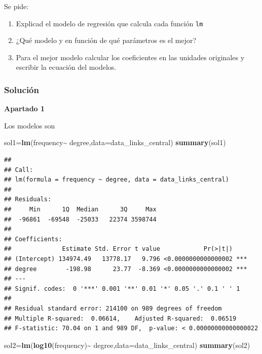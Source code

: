 \documentclass[
]{article}
\newenvironment{Shaded}{\begin{snugshade}}{\end{snugshade}}
\newcommand{\DataTypeTok}[1]{\textcolor[rgb]{0.13,0.29,0.53}{#1}}
\newcommand{\KeywordTok}[1]{\textcolor[rgb]{0.13,0.29,0.53}{\textbf{#1}}}
\newcommand{\NormalTok}[1]{#1}
\newcommand{\OperatorTok}[1]{\textcolor[rgb]{0.81,0.36,0.00}{\textbf{#1}}}
\newcommand{\StringTok}[1]{\textcolor[rgb]{0.31,0.60,0.02}{#1}}
\providecommand{\tightlist}{%
  \setlength{\itemsep}{0pt}\setlength{\parskip}{0pt}}
\begin{document}
Se pide:

\begin{enumerate}
\def\labelenumi{\arabic{enumi}.}
\tightlist
\item
  Explicad el modelo de regresión que calcula cada función \texttt{lm}
\item
  ¿Qué modelo y en función de qué parámetros es el mejor?
\item
  Para el mejor modelo calcular los coeficientes en las unidades
  originales y escribir la ecuación del modelos.
\end{enumerate}

\hypertarget{soluciuxf3n-11}{%
\subsubsection{Solución}\label{soluciuxf3n-11}}

\textbf{Apartado 1}

Los modelos son

\begin{Shaded}
\begin{Highlighting}[]
\NormalTok{sol1=}\KeywordTok{lm}\NormalTok{(frequency}\OperatorTok{\textasciitilde{}}\StringTok{ }\NormalTok{degree,}\DataTypeTok{data=}\NormalTok{data\_links\_central)}
\KeywordTok{summary}\NormalTok{(sol1)}
\end{Highlighting}
\end{Shaded}

\begin{verbatim}
## 
## Call:
## lm(formula = frequency ~ degree, data = data_links_central)
## 
## Residuals:
##     Min      1Q  Median      3Q     Max 
##  -96861  -69548  -25033   22374 3598744 
## 
## Coefficients:
##              Estimate Std. Error t value            Pr(>|t|)    
## (Intercept) 134974.49   13778.17   9.796 <0.0000000000000002 ***
## degree        -198.98      23.77  -8.369 <0.0000000000000002 ***
## ---
## Signif. codes:  0 '***' 0.001 '**' 0.01 '*' 0.05 '.' 0.1 ' ' 1
## 
## Residual standard error: 214100 on 989 degrees of freedom
## Multiple R-squared:  0.06614,    Adjusted R-squared:  0.06519 
## F-statistic: 70.04 on 1 and 989 DF,  p-value: < 0.00000000000000022
\end{verbatim}

\begin{Shaded}
\begin{Highlighting}[]
\NormalTok{sol2=}\KeywordTok{lm}\NormalTok{(}\KeywordTok{log10}\NormalTok{(frequency)}\OperatorTok{\textasciitilde{}}\StringTok{ }\NormalTok{degree,}\DataTypeTok{data=}\NormalTok{data\_links\_central)}
\KeywordTok{summary}\NormalTok{(sol2)}
\end{Highlighting}
\end{Shaded}
\end{document}
